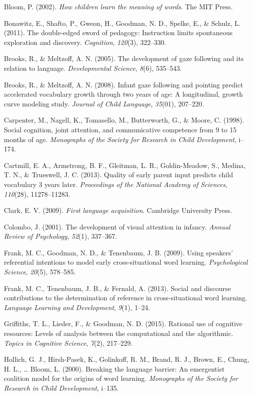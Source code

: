 \documentclass[a4paper,man,natbib]{apa6}
\begin{document}
Bloom, P. (2002). \emph{How children learn the meaning of words}. The
MIT Press.

Bonawitz, E., Shafto, P., Gweon, H., Goodman, N. D., Spelke, E., \&
Schulz, L. (2011). The double-edged sword of pedagogy: Instruction
limits spontaneous exploration and discovery. \emph{Cognition},
\emph{120}(3), 322--330.

Brooks, R., \& Meltzoff, A. N. (2005). The development of gaze following
and its relation to language. \emph{Developmental Science}, \emph{8}(6),
535--543.

Brooks, R., \& Meltzoff, A. N. (2008). Infant gaze following and
pointing predict accelerated vocabulary growth through two years of age:
A longitudinal, growth curve modeling study. \emph{Journal of Child
Language}, \emph{35}(01), 207--220.

Carpenter, M., Nagell, K., Tomasello, M., Butterworth, G., \& Moore, C.
(1998). Social cognition, joint attention, and communicative competence
from 9 to 15 months of age. \emph{Monographs of the Society for Research
in Child Development}, i--174.

Cartmill, E. A., Armstrong, B. F., Gleitman, L. R., Goldin-Meadow, S.,
Medina, T. N., \& Trueswell, J. C. (2013). Quality of early parent input
predicts child vocabulary 3 years later. \emph{Proceedings of the
National Academy of Sciences}, \emph{110}(28), 11278--11283.

Clark, E. V. (2009). \emph{First language acquisition}. Cambridge
University Press.

Colombo, J. (2001). The development of visual attention in infancy.
\emph{Annual Review of Psychology}, \emph{52}(1), 337--367.

Frank, M. C., Goodman, N. D., \& Tenenbaum, J. B. (2009). Using
speakers' referential intentions to model early cross-situational word
learning. \emph{Psychological Science}, \emph{20}(5), 578--585.

Frank, M. C., Tenenbaum, J. B., \& Fernald, A. (2013). Social and
discourse contributions to the determination of reference in
cross-situational word learning. \emph{Language Learning and
Development}, \emph{9}(1), 1--24.

Griffiths, T. L., Lieder, F., \& Goodman, N. D. (2015). Rational use of
cognitive resources: Levels of analysis between the computational and
the algorithmic. \emph{Topics in Cognitive Science}, \emph{7}(2),
217--229.

Hollich, G. J., Hirsh-Pasek, K., Golinkoff, R. M., Brand, R. J., Brown,
E., Chung, H. L., \ldots{} Bloom, L. (2000). Breaking the language
barrier: An emergentist coalition model for the origins of word
learning. \emph{Monographs of the Society for Research in Child
Development}, i--135.
\end{document}
